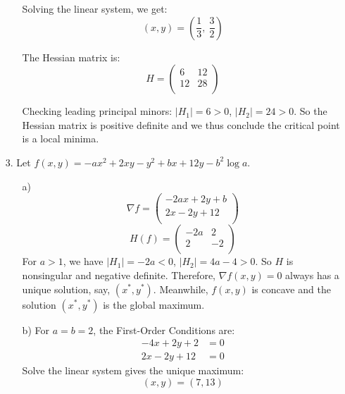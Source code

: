 \documentclass{article}
\begin{document}
\begin{enumerate}
\begin{enumerate}
        Solving the linear system, we get:
        $$  (x,y) = \left( \frac{1}{3},\ \frac{3}{2} \right)$$
        
        The Hessian matrix is:
        \[  H = 
            \begin{pmatrix}
                6  & 12 \\
                12 & 28 \\
            \end{pmatrix}
        \]
        
        Checking leading principal minors: $|H_1| = 6 > 0$, $|H_2| = 24 > 0$. 
        So the Hessian matrix is positive definite and we thus conclude the critical point is a local minima.\\
        
    \end{enumerate}


    \item[3. ] Let $f(x,y) = -ax^2 + 2xy - y^2 + bx + 12y - b^2 \log a$.
        \begin{enumerate}
            \item[a)] \[ 
                \nabla f =
                \begin{pmatrix}
                    -2ax + 2y + b \\
                    2x - 2y + 12 \\
                \end{pmatrix}
            \]
            \[
                H(f) = 
                \begin{pmatrix}
                    -2a &  2 \\
                    2   & -2 \\
                \end{pmatrix}
            \]
            For $a > 1$, we have $|H_1| = -2a < 0$, $|H_2| = 4a - 4 > 0$. So $H$ is nonsingular and negative definite. 
            Therefore, $\nabla f(x,y)=0$ always has a unique solution, say, $(x^*,y^*)$. 
            Meanwhile, $f(x,y)$ is concave and the solution $(x^*,y^*)$ is the global maximum.\\
            
            \item[b)] For $a=b=2$, the First-Order Conditions are:
                \begin{align*}
                    -4x + 2y + 2 &= 0 \\
                    2x  - 2y + 12 &= 0 
                \end{align*}
                Solve the linear system gives the unique maximum:
                $$ (x,y) = (7, 13) $$
                

\end{enumerate}
\end{enumerate}
\end{document}

